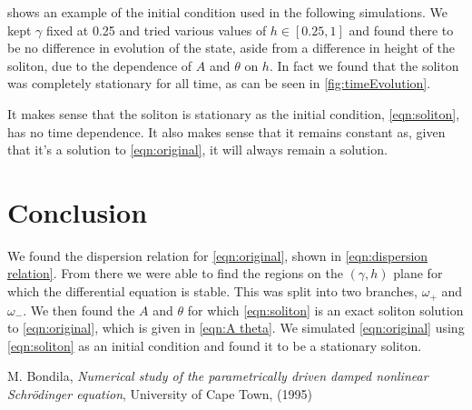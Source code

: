 \documentclass[11pt]{article}
\numberwithin{equation}{section}
\numberwithin{figure}{section}
\numberwithin{table}{section}
\begin{document}
\par {} shows an example of the initial condition used in the following simulations. We kept $\gamma$ fixed at 0.25 and tried various values of $h\in[0.25,1]$ and found there to be no difference in evolution of the state, aside from a difference in height of the soliton, due to the dependence of $A$ and $\theta$ on $h$. In fact we found that the soliton was completely stationary for all time, as can be seen in \cref{fig:timeEvolution}.


\par It makes sense that the soliton is stationary as the initial condition, \cref{eqn:soliton}, has no time dependence. It also makes sense that it remains constant as, given that it's a solution to \cref{eqn:original}, it will always remain a solution.

\section{Conclusion}\label{sec:Conclusion}
\par We found the dispersion relation for \cref{eqn:original}, shown in \cref{eqn:dispersion relation}. From there we were able to find the regions on the $(\gamma,h)$ plane for which the differential equation is stable. This was split into two branches, $\omega_+$ and $\omega_-$. We then found the $A$ and $\theta$ for which \cref{eqn:soliton} is an exact soliton solution to \cref{eqn:original}, which is given in \cref{eqn:A theta}. We simulated \cref{eqn:original} using \cref{eqn:soliton} as an initial condition and found it to be a stationary soliton.



\begin{thebibliography}{9}
    M. Bondila, \textit{Numerical study of the parametrically driven damped nonlinear Schr\"odinger equation}, University of Cape Town, (1995)
    
\end{thebibliography}
\end{document}
